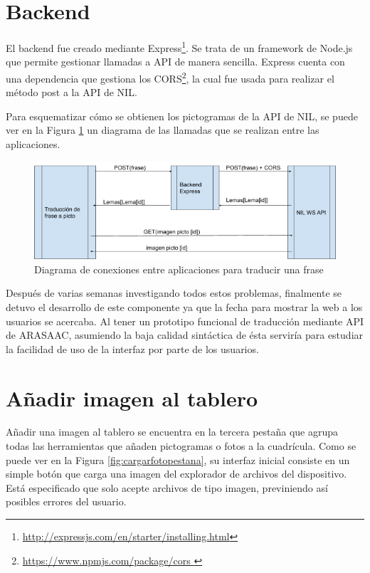 \section*{Backend}
\label{backend}

El backend fue creado mediante Express\footnote{\url{http://expressjs.com/en/starter/installing.html}}. Se trata de un framework de Node.js que permite gestionar llamadas a API de manera sencilla. Express cuenta con una dependencia que gestiona los CORS\footnote{\url{https://www.npmjs.com/package/cors }}, la cual fue usada para realizar el método post a la API de NIL. 

Para esquematizar cómo se obtienen los pictogramas de la API de NIL, se puede ver en la Figura \ref{fig:diagramaconexiones} un diagrama de las llamadas que se realizan entre las aplicaciones. 

\begin{figure}[h!]
	\centering
	\includegraphics[width=0.7\linewidth]{Imagenes/Bitmap/diagramaConexiones}
	\caption{Diagrama de conexiones entre aplicaciones para traducir una frase}
	\label{fig:diagramaconexiones}
\end{figure}


Después de varias semanas investigando todos estos problemas, finalmente se detuvo el desarrollo de este componente ya que la fecha para mostrar la web a los usuarios se acercaba. Al tener un prototipo funcional de traducción mediante API de ARASAAC, asumiendo la baja calidad sintáctica de ésta serviría para estudiar la facilidad de uso de la interfaz por parte de los usuarios.


\section{Añadir imagen al tablero}

Añadir una imagen al tablero se encuentra en la tercera pestaña que agrupa todas las herramientas que añaden pictogramas o fotos a la cuadrícula. Como se puede ver en la Figura \ref{fig:cargarfotopestana}, su interfaz inicial consiste en un simple botón que carga una imagen del explorador de archivos del dispositivo. Está especificado que solo acepte archivos de tipo imagen, previniendo así posibles errores del usuario. 

